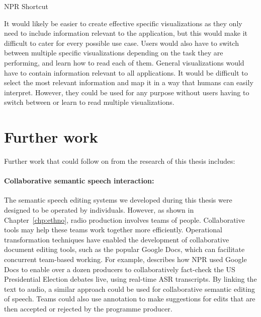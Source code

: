   NPR Shortcut\citet{Friedhoff2016}






It would likely be easier to create effective specific visualizations as they
only need to include information relevant to the application, but this would make it difficult to cater for every
possible use case. Users would also have to switch between multiple specific visualizations depending on the task they
are performing, and learn how to read each of them. General visualizations would have to contain information relevant
to all applications. It would be difficult to select the most relevant information and map it in a way that humans can
easily interpret. However, they could be used for any purpose without users having to switch between or learn to read
multiple visualizations.






\section{Further work}

Further work that could follow on from the research of this thesis includes:

\paragraph{Collaborative semantic speech interaction:}

The semantic speech editing systems we developed during this thesis were designed to be operated by individuals.
However, as shown in Chapter~\ref{chp:ethno}, radio production involves teams of people.  Collaborative tools may help
these teams work together more efficiently.  Operational transformation techniques \citep{Sun2004} have enabled the
development of collaborative document editing tools, such as the popular Google Docs, which can facilitate concurrent
team-based working.  For example, \citet{Fisher2016} describes how NPR used Google Docs to enable over a dozen
producers to collaboratively fact-check the US Presidential Election debates live, using real-time ASR transcripts. By
linking the text to audio, a similar approach could be used for collaborative semantic editing of speech. Teams could
also use annotation to make suggestions for edits that are then accepted or rejected by the programme producer.

